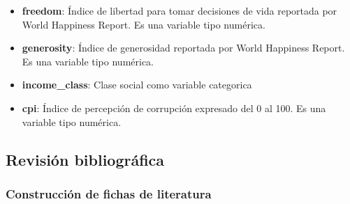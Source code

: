 \documentclass[12pt,oneside,letterpaper,spanish]{article}
\begin{document}
\begin{itemize}
\begin{itemize}
        \item \textbf{freedom}: Índice de libertad para tomar decisiones de vida reportada por World Happiness Report. Es una variable tipo numérica.
        \item \textbf{generosity}: Índice de generosidad reportada por World Happiness Report. Es una variable tipo numérica.
        \item \textbf{income\_class}: Clase social como variable categorica
        \item \textbf{cpi}: Índice de percepción de corrupción expresado del 0 al 100. Es una variable tipo numérica.
    \end{itemize}
\end{itemize}

\newpage
\subsection{Revisión bibliográfica}
\subsubsection{Construcción de fichas de literatura}
\end{document}
